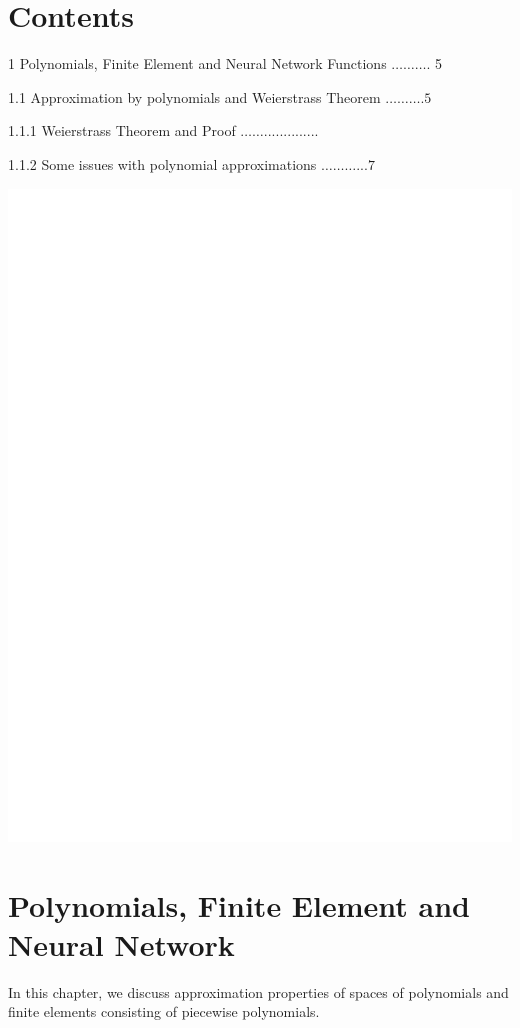 \documentclass[10pt]{article}
\begin{document}
\section{Contents}
1 Polynomials, Finite Element and Neural Network Functions $\ldots \ldots \ldots$. 5

1.1 Approximation by polynomials and Weierstrass Theorem $\ldots \ldots \ldots .5$

1.1.1 Weierstrass Theorem and Proof $\ldots \ldots . . . . . . . . . . . . . .$

1.1.2 Some issues with polynomial approximations $\ldots \ldots \ldots . . .7$

\includegraphics[max width=\textwidth]{2022_01_05_fba364634dde0bb701e1g-2}

\section{Polynomials, Finite Element and Neural Network}
In this chapter, we discuss approximation properties of spaces of polynomials and finite elements consisting of piecewise polynomials.
\end{document}
